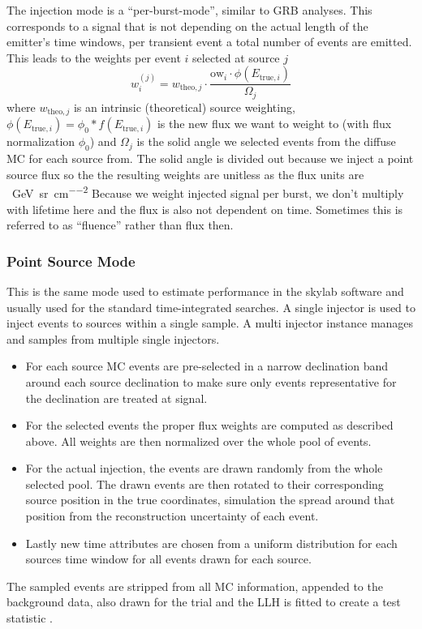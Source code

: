 The injection mode is a \enquote{per-burst-mode}, similar to GRB analyses.
This corresponds to a signal that is not depending on the actual length of the emitter's time windows, per transient event a total number of events are emitted.
This leads to the weights per event $i$ selected at source $j$
\begin{equation}
  w_i^{(j)} = w_{\mathrm{theo},j} \cdot
              \frac{\mathrm{ow}_i \cdot \phi(E_{\mathrm{true},i})}
                   {\Omega_j}
\end{equation}
where $w_{\mathrm{theo},j}$ is an intrinsic (theoretical) source weighting, $\phi(E_{\mathrm{true},i}) = \phi_0 * f(E_{\mathrm{true},i})$ is the new flux we want to weight to (with flux normalization $\phi_0$) and $\Omega_j$ is the solid angle we selected events from the diffuse MC for each source from.
The solid angle is divided out because we inject a point source flux so the the resulting weights are unitless as the flux units are \si{\per\GeV\per\steradian\per\cm\squared}
Because we weight injected signal per burst, we don't multiply with lifetime here and the flux is also not dependent on time.
Sometimes this is referred to as \enquote{fluence} rather than flux then.

\subsubsection*{Point Source Mode}
This is the same mode used to estimate performance in the skylab software and usually used for the standard time-integrated searches.
A single injector is used to inject events to sources within a single sample.
A multi injector instance manages and samples from multiple single injectors.
\begin{itemize}
  \item For each source MC events are pre-selected in a narrow declination band around each source declination to make sure only events representative for the declination are treated at signal.
  \item For the selected events the proper flux weights are computed as described above.
  All weights are then normalized over the whole pool of events.
  \item For the actual injection, the events are drawn randomly from the whole selected pool.
  The drawn events are then rotated to their corresponding source position in the true coordinates, simulation the spread around that position from the reconstruction uncertainty of each event.
  \item Lastly new time attributes are chosen from a uniform distribution for each sources time window for all events drawn for each source.
\end{itemize}
The sampled events are stripped from all MC information, appended to the background data, also drawn for the trial and the LLH is fitted to create a test statistic .

